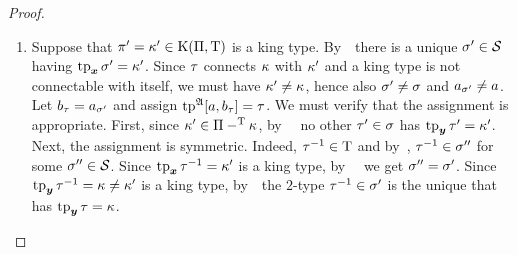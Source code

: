 \begin{proof}
\begin{description}
  \begin{enumerate}
  \item 
  Suppose that ${\pi'} = {\kappa'} \in \mathrm{K}(\Pi,\mathrm{T})$ is a king type.
  By~~there is a unique ${\sigma'} \in \mathcal{S}$ having $\operatorname{tp}_{\bm{x}}{\sigma'} =
  {\kappa'}$.
  Since $\tau$ connects $\kappa$ with ${\kappa'}$ and a king
  type is not connectable with itself, we must have ${\kappa'} \neq \kappa$, hence
  also ${\sigma'} \neq \sigma$ and $a_{{\sigma'}} \neq a$.
  Let $b_{\tau} = a_{{\sigma'}}$ and assign $\operatorname{tp}^{\mathfrak{A}}[a,b_{\tau}] = \tau$.
  We must verify that the assignment is appropriate.
  First, since ${\kappa'} \in \Pi -^{\mathrm{T}} \kappa$, by~~ no other
  ${\tau'} \in \sigma$ has $\operatorname{tp}_{\bm{y}}{\tau'} = {\kappa'}$.
  Next, the assignment is symmetric.
  Indeed, $\tau^{-1} \in \mathrm{T}$ and by~, $\tau^{-1} \in \sigma''$
  for some $\sigma'' \in \mathcal{S}$. Since $\operatorname{tp}_{\bm{x}}\tau^{-1} = {\kappa'}$ is a king type,
  by~~ we get $\sigma'' = {\sigma'}$. Since $\operatorname{tp}_{\bm{y}}\tau^{-1} = \kappa
  \neq {\kappa'}$ is a king type, by~~the $2$-type $\tau^{-1} \in
  {\sigma'}$ is the unique that has $\operatorname{tp}_{\bm{y}}\tau = \kappa$.
  

\end{enumerate}
\end{description}
\end{proof}
